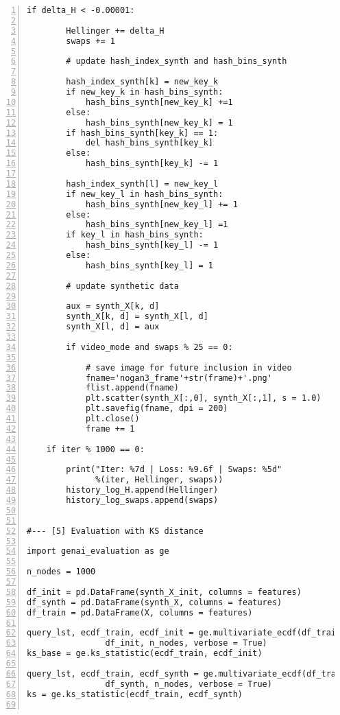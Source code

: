 \documentclass[oneside,10pt]{book}
\begin{document}
\begin{lstlisting}[numbers=left]
    if delta_H < -0.00001:

        Hellinger += delta_H
        swaps += 1

        # update hash_index_synth and hash_bins_synth

        hash_index_synth[k] = new_key_k
        if new_key_k in hash_bins_synth:
            hash_bins_synth[new_key_k] +=1
        else:
            hash_bins_synth[new_key_k] = 1
        if hash_bins_synth[key_k] == 1:
            del hash_bins_synth[key_k]
        else: 
            hash_bins_synth[key_k] -= 1
   
        hash_index_synth[l] = new_key_l
        if new_key_l in hash_bins_synth:
            hash_bins_synth[new_key_l] += 1
        else:
            hash_bins_synth[new_key_l] =1
        if key_l in hash_bins_synth:
            hash_bins_synth[key_l] -= 1
        else:
            hash_bins_synth[key_l] = 1

        # update synthetic data

        aux = synth_X[k, d]
        synth_X[k, d] = synth_X[l, d]
        synth_X[l, d] = aux

        if video_mode and swaps % 25 == 0:

            # save image for future inclusion in video
            fname='nogan3_frame'+str(frame)+'.png'
            flist.append(fname)
            plt.scatter(synth_X[:,0], synth_X[:,1], s = 1.0) 
            plt.savefig(fname, dpi = 200)
            plt.close() 
            frame += 1

    if iter % 1000 == 0:

        print("Iter: %7d | Loss: %9.6f | Swaps: %5d" 
              %(iter, Hellinger, swaps)) 
        history_log_H.append(Hellinger)
        history_log_swaps.append(swaps)


#--- [5] Evaluation with KS distance

import genai_evaluation as ge

n_nodes = 1000

df_init = pd.DataFrame(synth_X_init, columns = features)
df_synth = pd.DataFrame(synth_X, columns = features)
df_train = pd.DataFrame(X, columns = features) 

query_lst, ecdf_train, ecdf_init = ge.multivariate_ecdf(df_train, 
                df_init, n_nodes, verbose = True) 
ks_base = ge.ks_statistic(ecdf_train, ecdf_init)

query_lst, ecdf_train, ecdf_synth = ge.multivariate_ecdf(df_train, 
                df_synth, n_nodes, verbose = True) 
ks = ge.ks_statistic(ecdf_train, ecdf_synth)


\end{lstlisting}
\end{document}
